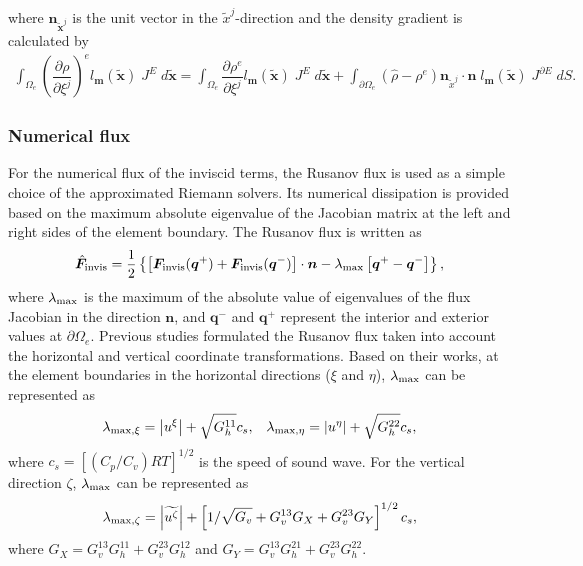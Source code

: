 where 
$\bm{n}_{\tilde{\bm{x}}^j}$ is the unit vector in the $\tilde{x}^j$-direction 
and  
the density gradient is calculated by
\begin{align}
  \int_{\Omega_e}  \left(\dfrac{\partial \rho}{\partial \xi^j}\right)^e l_{\bm{m}} (\tilde{\bm{x}}) \; J^E \; d\tilde{\bm{x}}
=  
    \int_{\Omega_e} \dfrac{\partial \rho^e}{\partial \xi^j} l_{\bm{m}} (\tilde{\bm{x}}) \; J^E \;  d\tilde{\bm{x}} 
  + \int_{\partial \Omega_{e}} (\hat{\rho} - \rho^e)\bm{n}_{\tilde{x}^j}  \cdot \bm{n} \; l_{\bm{m}} (\tilde{\bm{x}}) \; J^{\partial E} \; dS. 
\end{align}


\subsubsection{Numerical flux}
For the numerical flux of the inviscid terms, 
the Rusanov flux \citep{Rusanov1961} is used 
as a simple choice of the approximated Riemann solvers. 
Its numerical dissipation is provided based on the maximum absolute eigenvalue of the Jacobian matrix 
at the left and right sides of the element boundary. 
The Rusanov flux is written as 
\begin{equation}
 \hat{\bm{F}}_{\rm invis} 
 = \dfrac{1}{2}\left\{ \left[ \bm{F}_{\rm invis}(\bm{q}^+) + \bm{F}_{\rm invis}(\bm{q}^-) \right]\cdot\bm{n} - \lambda_{\rm max} \left[\bm{q}^+ - \bm{q}^- \right] \right\}, 
\end{equation}
where 
$\lambda_{\rm max}$ is the maximum of the absolute value of eigenvalues of the flux Jacobian in the direction $\bm{n}$, and 
$\bm{q}^-$ and $\bm{q}^+$ represent the interior and exterior values at $\partial \Omega_e$. 
Previous studies \citep[e.g.,][]{li2020development} formulated 
the Rusanov flux taken into account the horizontal and vertical coordinate transformations. 
Based on their works, 
at the element boundaries in the horizontal directions ($\xi$ and $\eta$), 
$\lambda_{\rm max}$ can be represented as  
\begin{equation}
 \lambda_{{\rm max},\xi}=\left|u^\xi \right| + \sqrt{G_h^{11}} c_s, 
\;\;\; 
\lambda_{{\rm max},\eta}=\left|u^\eta \right| + \sqrt{G_h^{22}} c_s, 
\end{equation}
where $c_s=[(C_p/C_v) RT]^{1/2}$ is the speed of sound wave.
For the vertical direction $\zeta$, 
$\lambda_{\rm max}$ can be represented as 
\begin{equation}
  \lambda_{{\rm max},\zeta} 
    = \left|\widetilde{u^\zeta} \right| 
    + \left[ 1/\sqrt{G_v} + G_v^{13}G_X + G_v^{23}G_Y \right]^{1/2} c_s, 
\end{equation}
where
$G_X=G_v^{13}G_h^{11} + G_v^{23}G_h^{12}$ 
and 
$G_Y=G_v^{13}G_h^{21} + G_v^{23}G_h^{22}$. 


